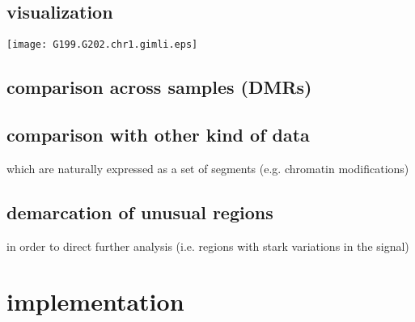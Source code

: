 \documentclass[11pt]{amsart}
\begin{document}
\subsection{visualization}

\texttt{[image: G199.G202.chr1.gimli.eps]}


\subsection{comparison across samples (DMRs)}



\subsection{comparison with other kind of data}

which are naturally expressed as a set of 
segments (e.g. chromatin modifications)

\subsection{demarcation of unusual regions} 
in order to direct further analysis 
(i.e. regions with stark variations in the signal)
\section{implementation}


\end{document}
